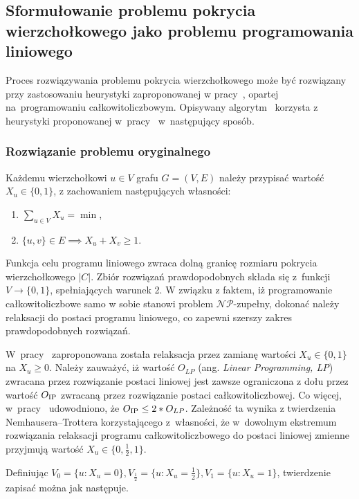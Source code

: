 \subsection{Sformułowanie problemu pokrycia wierzchołkowego jako problemu programowania liniowego}\label{section_kernelization_lp_formulation}

Proces rozwiązywania problemu pokrycia wierzchołkowego może być rozwiązany
przy zastosowaniu heurystyki zaproponowanej w pracy~\cite{hochbaum82}, opartej 
na~programowaniu całkowitoliczbowym.
Opisywany algorytm~\cite[rozdz.~4.2.2]{abukhzam03} korzysta z~ heurystyki proponowanej w~pracy~\cite{hochbaum82} 
w~następujący sposób.

\subsubsection{\textbf{Rozwiązanie problemu oryginalnego}}\label{ss_lp_original}
Każdemu wierzchołkowi $u \in V$ grafu $G=(V,E)$ należy przypisać wartość $X_u
\in \{0, 1\}$, z zachowaniem następujących własności:
\begin{enumerate}
  \item $\sum_{u \in V}X_u = \min$,
  \item $\{u,v\} \in E \implies X_u + X_v \geq 1$.
\end{enumerate}

Funkcja celu programu liniowego zwraca dolną granicę rozmiaru pokrycia wierzchołkowego $|C|$.
Zbiór rozwiązań prawdopodobnych składa się z~funkcji $V \to \{0, 1\}$,
spełniających warunek 2.
W związku z faktem, iż programowanie całkowitoliczbowe samo w sobie stanowi
problem $\mathcal{NP}$-zupełny, dokonać należy relaksacji do postaci programu liniowego, co
zapewni szerszy zakres prawdopodobnych rozwiązań.

W~pracy~\cite{khuller02} zaproponowana została relaksacja przez zamianę wartości 
$X_u \in \{0,1\}$ na $X_u \geq 0$.
Należy zauważyć, iż wartość $O_{LP}$ (ang. \emph{Linear Programming, LP}) zwracana przez rozwiązanie postaci 
liniowej jest zawsze ograniczona z dołu przez wartość $O_{\textnormal{IP}}$ zwracaną przez 
rozwiązanie postaci całkowitoliczbowej.
Co więcej, w~pracy~\cite{khuller02} udowodniono, że $O_{\textnormal{IP}} \leq 2*O_{LP}$.
Zależność ta wynika z twierdzenia Nemhausera--Trottera korzystającego
z~własności, że w~dowolnym ekstremum rozwiązania relaksacji programu
całkowitoliczbowego do postaci liniowej zmienne przyjmują wartość 
$X_u \in \{0, \frac{1}{2}, 1\}$.

Definiując $V_0 = \{u : X_u=0\}, V_{\frac{1}{2}}=\{u: X_u=\frac{1}{2}\},
V_1=\{u: X_u=1\}$, twierdzenie zapisać można jak następuje.

